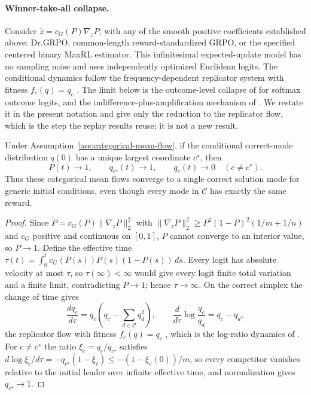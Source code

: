\paragraph{Winner-take-all collapse.}
Consider $\dot z=c_G(P)\nabla_zP$, with any of the smooth positive
coefficients established above: Dr.GRPO, common-length reward-standardized
GRPO, or the specified centered binary MaxRL estimator. This infinitesimal
expected-update model has
no sampling noise and uses independently optimized Euclidean logits. The
conditional dynamics follow the frequency-dependent replicator system
with fitness $f_c(q)=q_c$
\citep{hofbauer1998evolutionary,harper2009informationgeometry}.
The limit below is the outcome-level collapse of
\citet[Theorem~3.1]{sinha2026expected} for softmax outcome logits, and the
indifference-plus-amplification mechanism of
\citet[Sections~4.1--4.2]{lochab2026ucpo}. We restate it in the present
notation and give only the reduction to the replicator flow, which is the
step the replay results reuse; it is not a new result.

\begin{proposition}
\enforcehalffinalproseline
\label{thm:grpo-collapse}
Under Assumption~\ref{ass:categorical-mean-flow}, if the conditional correct-mode
distribution $q(0)$ has a unique largest coordinate $c^\star$, then
\[
  P(t)\longrightarrow1,
  \qquad
  q_{c^\star}(t)\longrightarrow1,
  \qquad
  q_c(t)\longrightarrow0\quad(c\ne c^\star).
\]
Thus these categorical mean flows converge to a single correct solution
mode for generic initial conditions, even though every mode in $\mathcal C$
has exactly the same reward.
\end{proposition}

\begin{proof}
\enforcehalffinalproseline
Since $\dot P=c_G(P)\lVert\nabla_zP\rVert_2^2$ with
$\lVert\nabla_zP\rVert_2^2\ge P^2(1-P)^2(1/m+1/n)$ and $c_G$ positive and
continuous on $[0,1]$, $P$ cannot converge to an interior value, so
$P\to1$. Define the effective time
$\tau(t)=\int_0^t c_G(P(s))P(s)(1-P(s))\,ds$. Every logit has absolute
velocity at most $\dot\tau$, so $\tau(\infty)<\infty$ would give every logit
finite total variation and a finite limit, contradicting $P\to1$; hence
$\tau\to\infty$. On the correct simplex the change of time gives
\begin{equation}
  \frac{dq_c}{d\tau}
  =q_c\left(q_c-\sum_{d\in\mathcal C}q_d^2\right),
  \qquad
  \frac{d}{d\tau}\log\frac{q_c}{q_d}=q_c-q_d,
  \label{eq:grpo-replicator}
\end{equation}
the replicator flow with fitness $f_c(q)=q_c$
\citep{hofbauer1998evolutionary}, which is the log-ratio dynamics of
\citet[Theorem~3.1]{sinha2026expected}. For $c\ne c^\star$ the ratio
$\xi_c=q_c/q_{c^\star}$ satisfies
$d\log\xi_c/d\tau=-q_{c^\star}(1-\xi_c)\le-(1-\xi_c(0))/m$, so every
competitor vanishes relative to the initial leader over infinite effective
time, and normalization gives $q_{c^\star}\to1$.
\end{proof}

